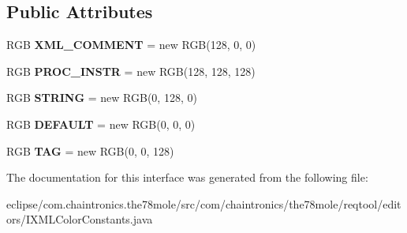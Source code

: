\subsection*{Public Attributes}
\begin{DoxyCompactItemize}
\item 
R\+GB {\bfseries X\+M\+L\+\_\+\+C\+O\+M\+M\+E\+NT} = new R\+GB(128, 0, 0)\hypertarget{interfacecom_1_1chaintronics_1_1the78mole_1_1reqtool_1_1editors_1_1IXMLColorConstants_a1790d296d5dddecfcddcd1a38654819d}{}\label{interfacecom_1_1chaintronics_1_1the78mole_1_1reqtool_1_1editors_1_1IXMLColorConstants_a1790d296d5dddecfcddcd1a38654819d}

\item 
R\+GB {\bfseries P\+R\+O\+C\+\_\+\+I\+N\+S\+TR} = new R\+GB(128, 128, 128)\hypertarget{interfacecom_1_1chaintronics_1_1the78mole_1_1reqtool_1_1editors_1_1IXMLColorConstants_ae0b02cc3cc4b8782429a6e607f123ddd}{}\label{interfacecom_1_1chaintronics_1_1the78mole_1_1reqtool_1_1editors_1_1IXMLColorConstants_ae0b02cc3cc4b8782429a6e607f123ddd}

\item 
R\+GB {\bfseries S\+T\+R\+I\+NG} = new R\+GB(0, 128, 0)\hypertarget{interfacecom_1_1chaintronics_1_1the78mole_1_1reqtool_1_1editors_1_1IXMLColorConstants_a8bcb06c4f136c91730be7d44dcc3316f}{}\label{interfacecom_1_1chaintronics_1_1the78mole_1_1reqtool_1_1editors_1_1IXMLColorConstants_a8bcb06c4f136c91730be7d44dcc3316f}

\item 
R\+GB {\bfseries D\+E\+F\+A\+U\+LT} = new R\+GB(0, 0, 0)\hypertarget{interfacecom_1_1chaintronics_1_1the78mole_1_1reqtool_1_1editors_1_1IXMLColorConstants_acf2efb0cd2319df9fd4da6522673a0d7}{}\label{interfacecom_1_1chaintronics_1_1the78mole_1_1reqtool_1_1editors_1_1IXMLColorConstants_acf2efb0cd2319df9fd4da6522673a0d7}

\item 
R\+GB {\bfseries T\+AG} = new R\+GB(0, 0, 128)\hypertarget{interfacecom_1_1chaintronics_1_1the78mole_1_1reqtool_1_1editors_1_1IXMLColorConstants_a8cecf5f35af6b3b8bc48cffc49142e93}{}\label{interfacecom_1_1chaintronics_1_1the78mole_1_1reqtool_1_1editors_1_1IXMLColorConstants_a8cecf5f35af6b3b8bc48cffc49142e93}

\end{DoxyCompactItemize}


The documentation for this interface was generated from the following file\+:\begin{DoxyCompactItemize}
\item 
eclipse/com.\+chaintronics.\+the78mole/src/com/chaintronics/the78mole/reqtool/editors/I\+X\+M\+L\+Color\+Constants.\+java\end{DoxyCompactItemize}
